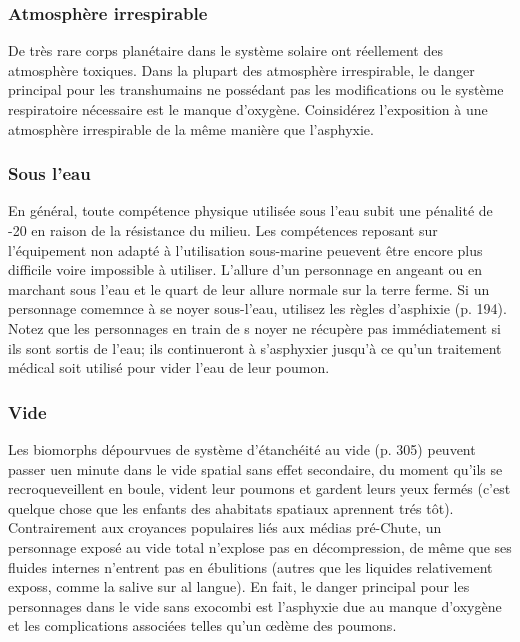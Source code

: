 \subsubsection{Atmosphère irrespirable} 

De très rare corps planétaire dans le système solaire ont réellement des atmosphère toxiques. Dans la plupart des atmosphère irrespirable, le danger principal pour les transhumains ne possédant pas les modifications ou le système respiratoire nécessaire est le manque d'oxygène. Coinsidérez l'exposition à une atmosphère irrespirable de la même manière que l'asphyxie. 

\subsubsection{Sous l'eau} 

En général, toute compétence physique utilisée sous l'eau subit une pénalité de -20 en raison de la résistance du milieu. Les compétences reposant sur l'équipement non adapté à l'utilisation sous-marine peuevent être encore plus difficile voire impossible à utiliser. L'allure d'un personnage en angeant ou en marchant sous l'eau et le quart de leur allure normale sur la terre ferme. Si un personnage comemnce à se noyer sous-l'eau, utilisez les règles d'asphixie (p. 194). Notez que les personnages en train de s noyer ne récupère pas immédiatement si ils sont sortis de l'eau; ils continueront à s'asphyxier jusqu'à ce qu'un traitement médical soit utilisé pour vider l'eau de leur poumon. 

\subsubsection{Vide} 

Les biomorphs dépourvues de système d'étanchéité au vide (p. 305) peuvent passer uen minute dans le vide spatial sans effet secondaire, du moment qu'ils se recroqueveillent en boule, vident leur poumons et gardent leurs yeux fermés (c'est quelque chose que les enfants des ahabitats spatiaux aprennent trés tôt). Contrairement aux croyances populaires liés aux médias pré-Chute, un personnage exposé au vide total n'explose pas en décompression, de même que ses fluides internes n'entrent pas en ébulitions (autres que les liquides relativement exposs, comme la salive sur al langue). En fait, le danger principal pour les personnages dans le vide sans exocombi est l'asphyxie due au manque d'oxygène et les complications associées telles qu'un œdème des poumons. 

